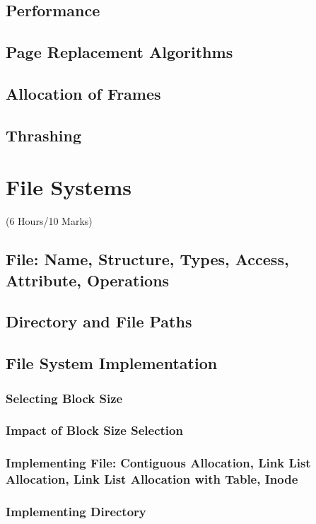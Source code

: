 \documentclass[12pt]{article}
\begin{document}
\subsection{Performance}
\subsection{Page Replacement Algorithms}
\subsection{Allocation of Frames}
\subsection{Thrashing}

\pagebreak
\section{File Systems}
\begin{center}(6 Hours/10 Marks)\end{center}
\subsection{File: Name, Structure, Types, Access, Attribute, Operations}
\subsection{Directory and File Paths}
\subsection{File System Implementation}
\subsubsection{Selecting Block Size}
\subsubsection{Impact of Block Size Selection}
\subsubsection{Implementing File: Contiguous Allocation, Link List Allocation, Link List Allocation with Table, Inode}
\subsubsection{Implementing Directory}
\end{document}

